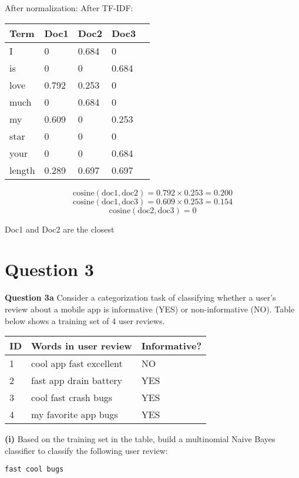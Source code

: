 \documentclass[11pt,a4paper]{report}
\begin{document}
\begin{multicols*}{2}
\noindent After normalization:
\noindent After TF-IDF:
\begin{center}
\begin{tabular}{ | l | l l l |l|} 
    \hline
    Term   & Doc1 & Doc2 & Doc3 \\
    \hline
    I      &0     &0.684 &0     \\
    is     &0     &0     &0.684 \\
    love   &0.792 &0.253 &0     \\
    much   &0     &0.684 &0     \\
    my     &0.609 &0     &0.253 \\
    star   &0     &0     &0     \\
    your   &0     &0     &0.684 \\
    \hline
    length &0.289 &0.697 &0.697 \\
    \hline
\end{tabular}
\end{center}

$$\text{cosine}(\text{doc1},\text{doc2})=0.792 \times 0.253 = 0.200$$
$$\text{cosine}(\text{doc1},\text{doc3})=0.609 \times 0.253 = 0.154$$
$$\text{cosine}(\text{doc2},\text{doc3})=0$$

\noindent Doc1 and Doc2 are the closest

\section{Question 3}

\noindent \textbf{Question 3a} Consider a categorization task of classifying whether a user's review about a mobile app is informative (YES) or non-informative (NO). Table below shows a training set of 4 user reviews.

\begin{center}
\begin{tabular}{ | l | l |l|} 
    \hline
    ID & Words in user review & Informative? \\
    \hline
    1  & cool app fast excellent & NO \\
    2  & fast app drain battery & YES \\
    3  & cool fast crash bugs & YES \\
    4  & my favorite app bugs & YES \\
    \hline
\end{tabular}
\end{center}

\noindent \textbf{(i)} Based on the training set in the table, build a multinomial Naive Bayes classifier to classify the following user review:
\begin{center}\verb|fast cool bugs|\end{center}


\end{multicols*}
\end{document}
